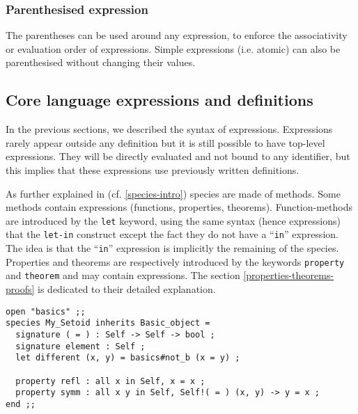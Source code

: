 \subsubsection{Parenthesised expression}
The parentheses can be used around any expression, to enforce the
associativity or evaluation order of expressions. Simple expressions
(i.e. atomic) can also be parenthesised without changing their
values.



\subsection{Core language expressions and definitions}
In the previous sections, we described the syntax of
expressions. Expressions rarely appear outside any
definition but it is still possible to have top-level
expressions. They  will be directly evaluated and not bound to any
identifier, but this implies that these expressions use previously
written definitions.

\medskip
As further explained  in (cf. \ref{species-intro}) species are made
of methods. Some methods contain expressions (functions, properties,
theorems). Function-methods are introduced by the {\tt let} keyword,
using the same syntax (hence expressions) that the {\tt let-in}
construct except the fact they do not have a ``{\tt in}'' expression.
The idea is that the ``{\tt in}'' expression is implicitly the
remaining of the species. Properties and theorems are respectively
introduced by the keywords {\tt property} and {\tt theorem} and may
 contain expressions. The  section
\ref{properties-theorems-proofs}  is dedicated to their detailed explanation.
{\scriptsize
\begin{lstlisting}
open "basics" ;;
species My_Setoid inherits Basic_object =
  signature ( = ) : Self -> Self -> bool ;
  signature element : Self ;
  let different (x, y) = basics#not_b (x = y) ;

  property refl : all x in Self, x = x ;
  property symm : all x y in Self, Self!( = ) (x, y) -> y = x ;
end ;;
\end{lstlisting}
}


\medskip

